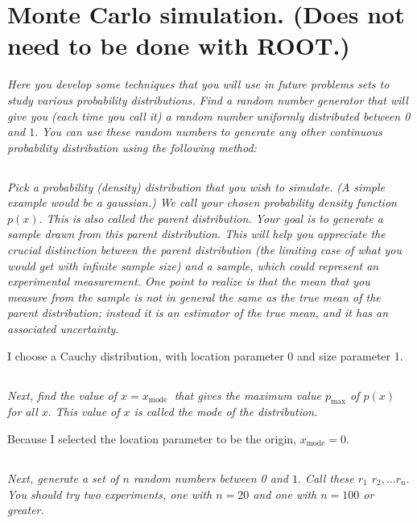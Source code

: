 \documentclass{article}
\begin{document}
\newpage


\section{Monte Carlo simulation. (Does not need to be done with ROOT.)}
\textit{ Here you develop some techniques that you will use in future problems sets to study various probability distributions. Find a random number generator that will give you (each time you call it) a random number uniformly distributed between 0 and $1 .$ You can use these random numbers to generate any other continuous probability distribution using the following method:}



\subsection{}
\textit{Pick a probability (density) distribution that you wish to simulate. (A simple example would be a gaussian.) We call your chosen probability density function $p(x) .$ This is also called the parent distribution. Your goal is to generate a sample drawn from this parent distribution. This will help you appreciate the crucial distinction between the parent distribution (the limiting case of what you would get with infinite sample size) and a sample, which could represent an experimental measurement. One point to realize is that the mean that you measure from the sample is not in general the same as the true mean of the parent distribution; instead it is an estimator of the true mean, and it has an associated uncertainty.}

I choose a Cauchy distribution, with location parameter 0 and size parameter 1. 

\subsection{}
\textit{Next, find the value of $x=x_{\text {mode }}$ that gives the maximum value $p_{\max }$ of $p(x)$ for all $x .$ This value of $x$ is called the mode of the distribution.}

Because I selected the location parameter to be the origin, $x_{\mathrm{mode}} = 0$.


\subsection{}
\textit{Next, generate a set of $n$ random numbers between 0 and $1 .$ Call these $r_{1}$ $r_{2}, \ldots r_{n} .$ You should try two experiments, one with $n=20$ and one with $n=100$ or greater.}
\end{document}
